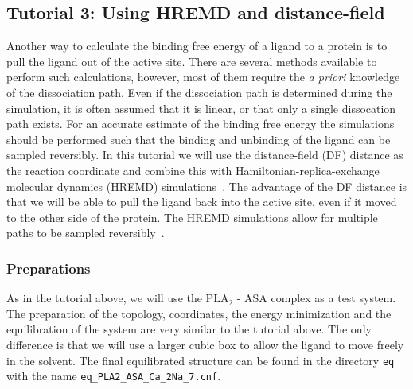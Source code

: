 
\subsection{Tutorial 3: Using HREMD and distance-field}
Another way to calculate the binding free energy of a ligand to a protein is to pull the ligand out of the active site. 
There are several methods available to perform such calculations, however, most of them require the \textit{a priori} knowledge of the dissociation path. 
Even if the dissociation path is determined during the simulation, it is often assumed that it is linear, or that only a single dissocation path exists. 
For an accurate estimate of the binding free energy the simulations should be performed such that the binding and unbinding of the ligand can be sampled reversibly.
In this tutorial we will use the distance-field (DF) distance as the reaction coordinate and combine this with Hamiltonian-replica-exchange molecular dynamics (HREMD) simulations~\cite{deRuiter_2013}.
The advantage of the DF distance is that we will be able to pull the ligand back into the active site, even if it moved to the other side of the protein. 
The HREMD simulations allow for multiple paths to be sampled reversibly~\cite{Nagy_2017}.

\subsubsection{Preparations}
As in the tutorial above, we will use the PLA$_2$ - ASA complex as a test system. 
The preparation of the topology, coordinates, the energy minimization and the equilibration of the system are very similar to the tutorial above. 
The only difference is that we will use a larger cubic box to allow the ligand to move freely in the solvent. 
The final equilibrated structure can be found in the directory \texttt{eq} with the name \texttt{eq\_PLA2\_ASA\_Ca\_2Na\_7.cnf}.

